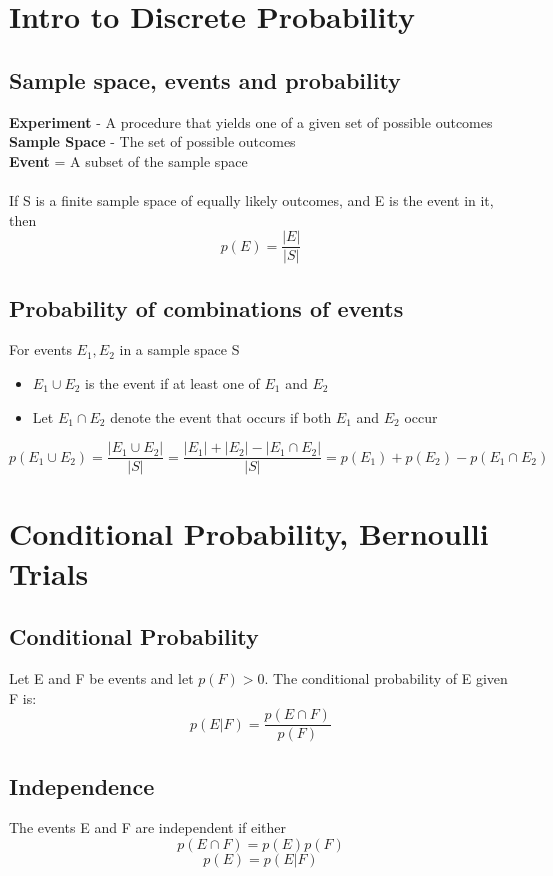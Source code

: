 \documentclass{article}[18pt]
\begin{document}
\section{Intro to Discrete Probability}
\subsection{Sample space, events and probability}
\textbf{Experiment} - A procedure that yields one of a given set of possible outcomes\\
\textbf{Sample Space} - The set of possible outcomes\\
\textbf{Event} = A subset of the sample space\\
\\
If S is a finite sample space of equally likely outcomes, and E is the event in it, then
$$p(E)=\dfrac{|E|}{|S|}$$
\subsection{Probability of combinations of events}
For events $E_1,E_2$ in a sample space S
\begin{itemize}
	\item $E_1\cup E_2$ is the event if at least one of $E_1$ and $E_2$
	\item Let $E_1\cap E_2$ denote the event that occurs if both $E_1$ and $E_2$ occur
\end{itemize}
$$p(E_1\cup E_2)=\dfrac{|E_1\cup E_2|}{|S|}=\dfrac{|E_1|+|E_2|-|E_1\cap E_2|}{|S|}=p(E_1)+p(E_2)-p(E_1\cap E_2)$$
\section{Conditional Probability, Bernoulli Trials}
\subsection{Conditional Probability}
Let E and F be events and let $p(F)>0$. The conditional probability of E given F is:
$$p(E|F)=\dfrac{p(E\cap F)}{p(F)}$$
\subsection{Independence}
The events E and F are independent if either
$$p(E\cap F)=p(E)p(F)$$
$$p(E)=p(E|F)$$
\end{document}
